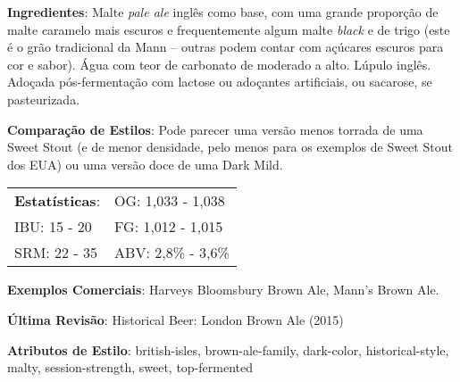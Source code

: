 \textbf{Ingredientes}: Malte \textit{pale ale} inglês como base, com uma grande proporção de malte caramelo mais escuros e frequentemente algum malte \textit{black} e de trigo (este é o grão tradicional da Mann – outras podem contar com açúcares escuros para cor e sabor). Água com teor de carbonato de moderado a alto. Lúpulo inglês. Adoçada pós-fermentação com lactose ou adoçantes artificiais, ou sacarose, se pasteurizada.

\textbf{Comparação de Estilos}: Pode parecer uma versão menos torrada de uma Sweet Stout (e de menor densidade, pelo menos para os exemplos de Sweet Stout dos EUA) ou uma versão doce de uma Dark Mild.

\begin{tabular}{@{}p{35mm}p{35mm}@{}}
  \textbf{Estatísticas}: & OG: 1,033 - 1,038  \\
  IBU: 15 - 20  & FG: 1,012 - 1,015  \\
  SRM: 22 - 35 & ABV: 2,8\% - 3,6\%
\end{tabular}

\textbf{Exemplos Comerciais}: Harveys Bloomsbury Brown Ale, Mann's Brown Ale.

\textbf{Última Revisão}: Historical Beer: London Brown Ale (2015)

\textbf{Atributos de Estilo}: british-isles, brown-ale-family, dark-color, historical-style, malty, session-strength, sweet, top-fermented
